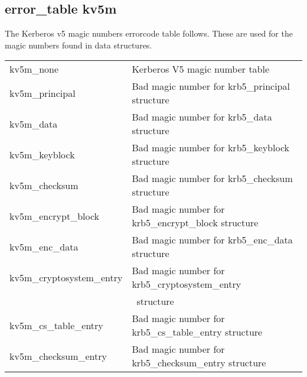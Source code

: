 
\subsection{error_table kv5m}

The Kerberos v5 magic numbers errorcode table follows. These are used
for the magic numbers found in data structures.

\begin{small}
\begin{tabular}{ll} 
{\sc kv5m_none }&		Kerberos V5 magic number table \\
{\sc kv5m_principal }&	Bad magic number for krb5_principal structure \\
{\sc kv5m_data }&		Bad magic number for krb5_data structure \\
{\sc kv5m_keyblock }&	Bad magic number for krb5_keyblock structure \\
{\sc kv5m_checksum }&	Bad magic number for krb5_checksum structure \\
{\sc kv5m_encrypt_block }&	Bad magic number for krb5_encrypt_block structure \\
{\sc kv5m_enc_data }&	Bad magic number for krb5_enc_data structure \\
{\sc kv5m_cryptosystem_entry }&	Bad magic number for krb5_cryptosystem_entry\\&\ structure \\
{\sc kv5m_cs_table_entry }&	Bad magic number for krb5_cs_table_entry structure \\
{\sc kv5m_checksum_entry }&	Bad magic number for krb5_checksum_entry structure \\


\end{tabular}
\end{small}
